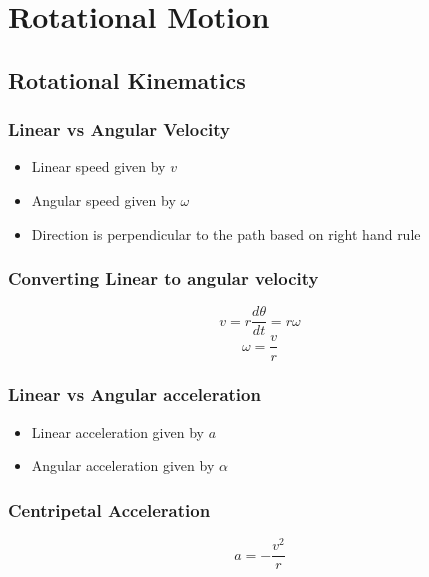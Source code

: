 \documentclass[../Notes.tex]{subfiles}
\begin{document}
    \section{Rotational Motion}

    \subsection{Rotational Kinematics}

    \subsubsection{Linear vs Angular Velocity}
    \begin{itemize}
        \item Linear speed given by $v$
        \item Angular speed given by $\omega$
        \item Direction is perpendicular to the path based on right hand rule
    \end{itemize}

    \subsubsection{Converting Linear to angular velocity}
    \begin{equation*}
        v = r \frac{d\theta}{dt} = r \omega
    \end{equation*}
    \begin{equation*}
        \omega = \frac{v}{r}
    \end{equation*}

    \subsubsection{Linear vs Angular acceleration}
    \begin{itemize}
        \item Linear acceleration given by $a$
        \item Angular acceleration given by $\alpha$
    \end{itemize}

    \subsubsection{Centripetal Acceleration}
    \begin{equation*}
        a = -\frac{v^2}{r}
    \end{equation*}
\end{document}
